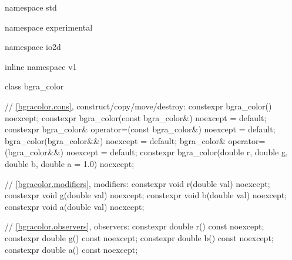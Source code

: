 \begin{codeblock}
namespace std { namespace experimental { namespace io2d { inline namespace v1 {
  class bgra_color {
    // \ref{bgracolor.cons}, construct/copy/move/destroy:
    constexpr bgra_color() noexcept;
    constexpr bgra_color(const bgra_color&) noexcept = default;
    constexpr bgra_color& operator=(const bgra_color&) noexcept = default;
    bgra_color(bgra_color&&) noexcept = default;
    bgra_color& operator=(bgra_color&&) noexcept = default;
    constexpr bgra_color(double r, double g, double b, double a = 1.0) noexcept;
  
    // \ref{bgracolor.modifiers}, modifiers:
    constexpr void r(double val) noexcept;
    constexpr void g(double val) noexcept;
    constexpr void b(double val) noexcept;
    constexpr void a(double val) noexcept;
    
    // \ref{bgracolor.observers}, observers:
    constexpr double r() const noexcept;
    constexpr double g() const noexcept;
    constexpr double b() const noexcept;
    constexpr double a() const noexcept;
    
}}}}}
\end{codeblock}
